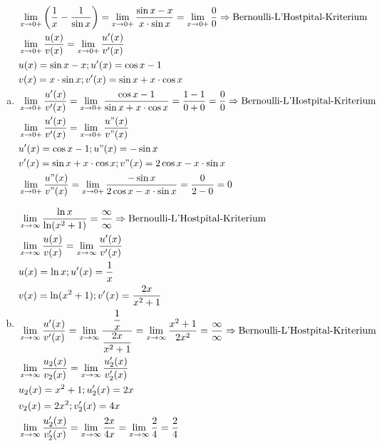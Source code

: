 \documentclass[
    10pt,
    parskip=half-,
    paper=a4,
    english,ngerman,
    fleqn
]{scrartcl}
\begin{document}
\begin{enumerate}[a)]
\item
    \begin{align*}
        &\lim_{x\to0+}\left(\dfrac{1}{x} - \dfrac{1}{\sin x}\right)
            = \lim_{x\to0+}\dfrac{\sin x - x}{x\cdot\sin x}
            = \lim_{x\to0+}\dfrac{0}{0} \Rightarrow\text{Bernoulli-L'Hostpital-Kriterium}\\
        &\lim_{x\to0+} \dfrac{u(x)}{v(x)} = \lim_{x\to0+} \dfrac{u'(x)}{v'(x)}\\
        &u(x) = \sin x - x; u'(x) = \cos x - 1\\
        &v(x) = x \cdot \sin x; v'(x) = \sin x + x \cdot \cos x\\
        &\lim_{x\to0+} \dfrac{u'(x)}{v'(x)}
            = \lim_{x\to0+} \dfrac{\cos x - 1}{\sin x + x \cdot \cos x}
            = \dfrac{1-1}{0+0} = \dfrac{0}{0} \Rightarrow\text{Bernoulli-L'Hostpital-Kriterium}\\
        &\lim_{x\to0+} \dfrac{u'(x)}{v'(x)} = \lim_{x\to0+} \dfrac{u"(x)}{v"(x)}\\
        &u'(x) = \cos x - 1; u"(x) = -\sin x\\
        &v'(x) = \sin x + x \cdot \cos x; v"(x) = 2\cos x - x \cdot \sin x\\
        &\lim_{x\to0+} \dfrac{u"(x)}{v"(x)}
            = \lim_{x\to0+}\dfrac{-\sin x}{2\cos x - x \cdot \sin x}
            = \dfrac{0}{2-0} = 0\\
    \end{align*}
\item
    \begin{align*}
        &\lim_{x\to\infty}\dfrac{\ln x}{\ln(x^2+1)}=\dfrac{\infty}{\infty} \Rightarrow\text{Bernoulli-L'Hostpital-Kriterium}\\
        &\lim_{x\to\infty}\dfrac{u(x)}{v(x)}=\lim_{x\to\infty}\dfrac{u'(x)}{v'(x)}\\
        &u(x) = \ln x; u'(x) = \dfrac{1}{x}\\
        &v(x) = \ln(x^2 + 1); v'(x) = \dfrac{2x}{x^2+1}\\
        &\lim_{x\to\infty} \dfrac{u'(x)}{v'(x)}
            = \lim_{x\to\infty} \dfrac{ \dfrac{1}{x} }{ \dfrac{2x}{x^2+1} }
            = \lim_{x\to\infty} \dfrac{x^2+1}{2x^2} = \dfrac{\infty}{\infty}\Rightarrow\text{Bernoulli-L'Hostpital-Kriterium}\\
        &\lim_{x\to\infty} \dfrac{u_2(x)}{v_2(x)}
            =\lim_{x\to\infty} \dfrac{u_2'(x)}{v_2'(x)}\\
        &u_2(x) = x^2 + 1; u_2'(x) = 2x\\
        &v_2(x) = 2x^2; v_2'(x) = 4x\\
        &\lim_{x\to\infty}\dfrac{u_2'(x)}{v_2'(x)} = \lim_{x\to\infty}\dfrac{2x}{4x}
            = \lim_{x\to\infty} \dfrac{2}{4} = \dfrac{2}{4}\\
    \end{align*}
\end{enumerate}
\end{document}
